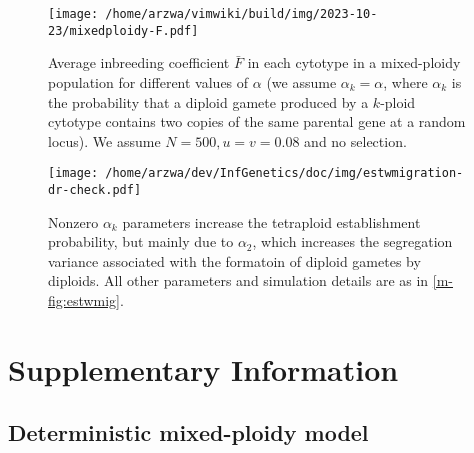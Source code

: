 \documentclass[11pt,a4paper]{article}
\begin{document}
\begin{figure}[H]
\centering
\texttt{[image: /home/arzwa/vimwiki/build/img/2023-10-23/mixedploidy-F.pdf]}
\caption{Average inbreeding coefficient \(\bar{F}\) in each cytotype in
a mixed-ploidy population for different values of \(\alpha\) (we assume
\(\alpha_k=\alpha\), where \(\alpha_k\) is the probability that a
diploid gamete produced by a \(k\)-ploid cytotype contains two copies of
the same parental gene at a random locus). We assume \(N=500, u=v=0.08\)
and no selection.}\label{fig:f1}
\end{figure}

\begin{figure}
\texttt{[image: /home/arzwa/dev/InfGenetics/doc/img/estwmigration-dr-check.pdf]}
\caption{
    Nonzero $\alpha_k$ parameters increase the tetraploid establishment
    probability, but mainly due to $\alpha_2$, which increases the segregation
    variance associated with the formatoin of diploid gametes by diploids.
    All other parameters and simulation details are as in \cref{m-fig:estwmig}.
\label{fig:suppdr}}
\end{figure}

\clearpage

\section{Supplementary Information}

\subsection{Deterministic mixed-ploidy model \label{sec:det}}
\end{document}
